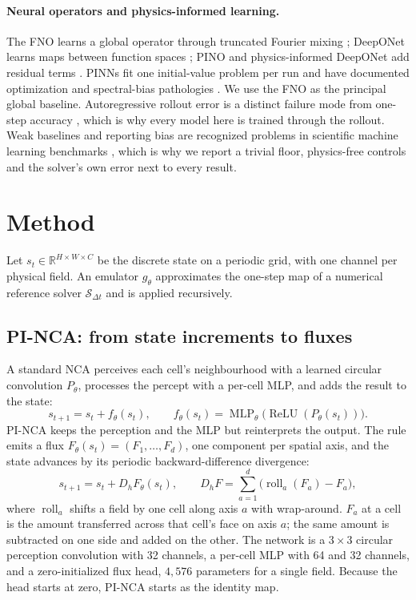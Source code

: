 \documentclass{article}
\begin{document}
\paragraph{Neural operators and physics-informed learning.}
The FNO learns a global operator through truncated Fourier mixing
\citep{li2020fno,neuraloperator}; DeepONet learns maps between function spaces
\citep{lu2021deeponet}; PINO and physics-informed DeepONet add residual terms
\citep{li2021pino,wang2021pideeponet}. PINNs fit one initial-value problem per run
\citep{raissi2019pinn} and have documented optimization and spectral-bias pathologies
\citep{krishnapriyan2021failure,wang2024causality,rahaman2019spectral}. We use the FNO as
the principal global baseline. Autoregressive rollout error is a distinct failure mode from
one-step accuracy \citep{lippe2023refiner,um2020solver}, which is why every model here is
trained through the rollout. Weak baselines and reporting bias are recognized problems in
scientific machine learning benchmarks \citep{mcgreivy2024baselines,pdebench,apebench},
which is why we report a trivial floor, physics-free controls and the solver's own error
next to every result.

\section{Method}
\label{sec:method}
\label{sec:methods}
\label{sec:arch}
Let $s_t\in\mathbb{R}^{H\times W\times C}$ be the discrete state on a periodic grid, with
one channel per physical field. An emulator $g_\theta$ approximates the one-step map of a
numerical reference solver $\mathcal{S}_{\Delta t}$ and is applied recursively.

\subsection{PI-NCA: from state increments to fluxes}
A standard NCA perceives each cell's neighbourhood with a learned circular convolution
$P_\theta$, processes the percept with a per-cell MLP, and adds the result to the state:
\begin{equation}
 s_{t+1}=s_t+f_\theta(s_t),\qquad
 f_\theta(s_t)=\operatorname{MLP}_\theta\bigl(\operatorname{ReLU}(P_\theta(s_t))\bigr).
\label{eq:plain}
\end{equation}
PI-NCA keeps the perception and the MLP but reinterprets the output. The rule emits a flux
$F_\theta(s_t)=(F_1,\dots,F_d)$, one component per spatial axis, and the state advances by
its periodic backward-difference divergence:
\begin{equation}
 s_{t+1}=s_t+D_hF_\theta(s_t),\qquad
 D_hF=\sum_{a=1}^{d}\bigl(\operatorname{roll}_a(F_a)-F_a\bigr),
\label{eq:flux}
\end{equation}
where $\operatorname{roll}_a$ shifts a field by one cell along axis $a$ with wrap-around.
$F_a$ at a cell is the amount transferred across that cell's face on axis $a$; the same
amount is subtracted on one side and added on the other. The network is a $3\times3$
circular perception convolution with 32 channels, a per-cell MLP with 64 and 32 channels,
and a zero-initialized flux head, $4{,}576$ parameters for a single field. Because the head
starts at zero, PI-NCA starts as the identity map.
\end{document}
